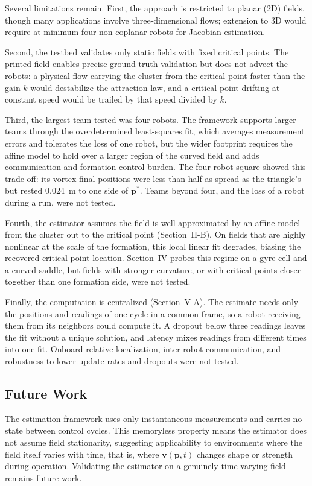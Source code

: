 \documentclass[lettersize,journal]{IEEEtran}
\newcommand{\rev}[1]{#1}
\begin{document}
Several limitations remain. First, the approach is restricted to planar (2D) fields, though many applications involve three-dimensional flows; extension to 3D would require at minimum four non-coplanar robots for Jacobian estimation.

Second, the testbed validates only static fields with fixed critical points. The printed field enables precise ground-truth validation but does not advect the robots: a physical flow carrying the cluster from the critical point faster than the gain $k$ would destabilize the attraction law, and a critical point drifting at constant speed would be trailed by that speed divided by $k$.

Third, the largest team tested was four robots. The framework supports larger teams through the overdetermined least-squares fit, which averages measurement errors and tolerates the loss of one robot, but the wider footprint requires the affine model to hold over a larger region of the curved field and adds communication and formation-control burden. The four-robot square showed this trade-off: its vortex final positions were less than half as spread as the triangle's but rested \rev{0.024}~m to one side of $\mathbf{p}^*$. Teams beyond four, and the loss of a robot during a run, were not tested.

Fourth, the estimator assumes the field is well approximated by an affine model from the cluster out to the critical point (Section~II-B). On fields that are highly nonlinear at the scale of the formation, this local linear fit degrades, biasing the recovered critical point location. Section~IV probes this regime on a gyre cell and a curved saddle, but fields with stronger curvature, or with critical points closer together than one formation side, were not tested.

Finally, the computation is centralized (Section~V-A). The estimate needs only the positions and readings of one cycle in a common frame, so a robot receiving them from its neighbors could compute it. A dropout below three readings leaves the fit without a unique solution, and latency mixes readings from different times into one fit. Onboard relative localization, inter-robot communication, and robustness to lower update rates and dropouts were not tested.

\subsection{Future Work}

The estimation framework uses only instantaneous measurements and carries no state between control cycles. This memoryless property means the estimator does not assume field stationarity, suggesting applicability to environments where the field itself varies with time, that is, where $\mathbf{v}(\mathbf{p}, t)$ changes shape or strength during operation. Validating the estimator on a genuinely time-varying field remains future work.
\end{document}
